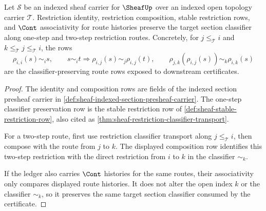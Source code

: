 \begin{theorem}
\label{thm:sheaf-root-unblock-restriction-stability-obligation}
Let $\mathcal{S}$ be an indexed sheaf carrier for $\SheafUp$ over an indexed open topology carrier $\mathcal{T}$. Restriction identity, restriction composition, stable restriction rows, and $\Cont$ associativity for route histories preserve the target section classifier along one-step and two-step restriction routes. Concretely, for $j\le_{\mathcal{T}}i$ and $k\le_{\mathcal{T}}j\le_{\mathcal{T}}i$, the rows
$$
\rho_{i,i}(s)\sim_i s,
\qquad
s\sim_i t\Longrightarrow \rho_{i,j}(s)\sim_j\rho_{i,j}(t),
\qquad
\rho_{j,k}(\rho_{i,j}(s))\sim_k\rho_{i,k}(s)
$$
are the classifier-preserving route rows exposed to downstream certificates.
\end{theorem}
\begin{proof}
The identity and composition rows are fields of the indexed section presheaf carrier in \autoref{def:sheaf-indexed-section-presheaf-carrier}. The one-step classifier preservation row is the stable restriction row of \autoref{def:sheaf-stable-restriction-row}, also cited as \autoref{thm:sheaf-restriction-classifier-transport}.

For a two-step route, first use restriction classifier transport along $j\le_{\mathcal{T}}i$, then compose with the route from $j$ to $k$. The displayed composition row identifies this two-step restriction with the direct restriction from $i$ to $k$ in the classifier $\sim_k$.

If the ledger also carries $\Cont$ histories for the same routes, their associativity only compares displayed route histories. It does not alter the open index $k$ or the classifier $\sim_k$, so it preserves the same target section classifier consumed by the certificate.
\end{proof}

